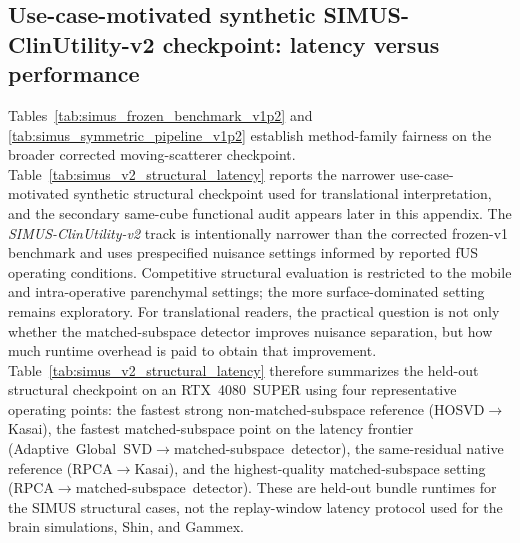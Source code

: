 \subsection{Use-case-motivated synthetic SIMUS-ClinUtility-v2 checkpoint: latency versus performance}
\label{app:simus-v2-latency}
Tables~\ref{tab:simus_frozen_benchmark_v1p2} and \ref{tab:simus_symmetric_pipeline_v1p2} establish method-family fairness on the broader corrected moving-scatterer checkpoint. Table~\ref{tab:simus_v2_structural_latency} reports the narrower use-case-motivated synthetic structural checkpoint used for translational interpretation, and the secondary same-cube functional audit appears later in this appendix. The \emph{SIMUS-ClinUtility-v2} track is intentionally narrower than the corrected frozen-v1 benchmark and uses prespecified nuisance settings informed by reported fUS operating conditions. Competitive structural evaluation is restricted to the mobile and intra-operative parenchymal settings; the more surface-dominated setting remains exploratory. For translational readers, the practical question is not only whether the matched-subspace detector improves nuisance separation, but how much runtime overhead is paid to obtain that improvement. Table~\ref{tab:simus_v2_structural_latency} therefore summarizes the held-out structural checkpoint on an RTX~4080~SUPER using four representative operating points: the fastest strong non-matched-subspace reference (\mbox{HOSVD$\rightarrow$Kasai}), the fastest matched-subspace point on the latency frontier (\mbox{Adaptive~Global~SVD$\rightarrow$matched-subspace detector}), the same-residual native reference (\mbox{RPCA$\rightarrow$Kasai}), and the highest-quality matched-subspace setting (\mbox{RPCA$\rightarrow$matched-subspace detector}). These are held-out bundle runtimes for the SIMUS structural cases, not the replay-window latency protocol used for the brain simulations, Shin, and Gammex.

